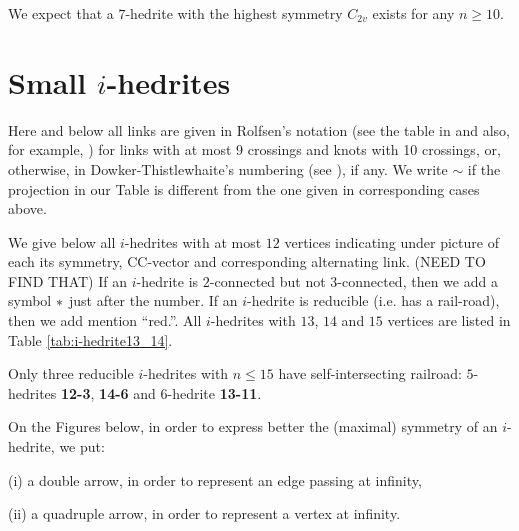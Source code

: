 \documentclass[12pt]{article}
\begin{document}
We expect that a $7$-hedrite with the highest symmetry $C_{2v}$ 
exists for any $n\geq 10$.







\section{Small $i$-hedrites}

Here and below all links are given 
in Rolfsen's notation (see the table in \cite{Rolf} and also,  
for example, \cite{Kaw}) for links with at most 9 
crossings and knots with 10 crossings, or, otherwise, in
Dowker-Thistlewhaite's numbering (see \cite{T}), if any.
We write $\sim$ if the projection in our Table is different 
from the one given in corresponding cases above.

We give below all $i$-hedrites with at most $12$ vertices indicating under 
picture of each its symmetry, CC-vector and corresponding alternating link.
(NEED TO FIND THAT)
If an $i$-hedrite is $2$-connected but not $3$-connected, then we add
a symbol ${\bf *}$ just after the number. If an $i$-hedrite is reducible
(i.e. has a rail-road), then we add mention ``red.''. All $i$-hedrites
with $13$, $14$ and $15$ vertices are listed in Table
\ref{tab:i-hedrite13_14}.

Only three reducible $i$-hedrites with $n \leq 15$ have self-intersecting
railroad: $5$-hedrites {\bf 12-3}, {\bf 14-6} and $6$-hedrite {\bf 13-11}.


On the Figures below, in order to express better the (maximal)
symmetry of an $i$-hedrite, we put:

(i) a double arrow, in order to represent an edge passing at infinity,

(ii) a quadruple arrow, in order to represent a vertex at infinity.
\end{document}
